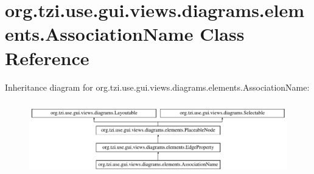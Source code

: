 \hypertarget{classorg_1_1tzi_1_1use_1_1gui_1_1views_1_1diagrams_1_1elements_1_1_association_name}{\section{org.\-tzi.\-use.\-gui.\-views.\-diagrams.\-elements.\-Association\-Name Class Reference}
\label{classorg_1_1tzi_1_1use_1_1gui_1_1views_1_1diagrams_1_1elements_1_1_association_name}
}
Inheritance diagram for org.\-tzi.\-use.\-gui.\-views.\-diagrams.\-elements.\-Association\-Name\-:\begin{figure}[H]
\begin{center}
\leavevmode
\includegraphics[height=3.246377cm]{classorg_1_1tzi_1_1use_1_1gui_1_1views_1_1diagrams_1_1elements_1_1_association_name}
\end{center}
\end{figure}
